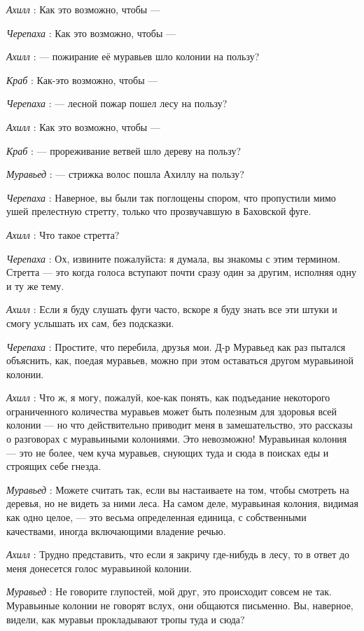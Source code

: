 \documentclass[../main.tex]{subfiles}
\begin{document}
\begin{dialogue}
\emph{Ахилл} : Как это возможно, чтобы ---

\emph{Черепаха} : Как это возможно, чтобы ---

\emph{Ахилл} : --- пожирание её муравьев шло колонии на пользу?

\emph{Краб} : Как-это возможно, чтобы ---

\emph{Черепаха} : --- лесной пожар пошел лесу на пользу?

\emph{Ахилл} : Как это возможно, чтобы ---

\emph{Краб} : --- прореживание ветвей шло дереву на пользу?

\emph{Муравьед} : --- стрижка волос пошла Ахиллу на пользу?

\emph{Черепаха} : Наверное, вы были так поглощены спором, что пропустили мимо ушей прелестную стретту, только что прозвучавшую в Баховской фуге.

\emph{Ахилл} : Что такое стретта?

\emph{Черепаха} : Ох, извините пожалуйста: я думала, вы знакомы с этим термином. Стретта --- это когда голоса вступают почти сразу один за другим, исполняя одну и ту же тему.

\emph{Ахилл} : Если я буду слушать фуги часто, вскоре я буду знать все эти штуки и смогу услышать их сам, без подсказки.

\emph{Черепаха} : Простите, что перебила, друзья мои. Д-р Муравьед как раз пытался объяснить, как, поедая муравьев, можно при этом оставаться другом муравьиной колонии.

\emph{Ахилл} : Что ж, я могу, пожалуй, кое-как понять, как подъедание некоторого ограниченного количества муравьев может быть полезным для здоровья всей колонии --- но что действительно приводит меня в замешательство, это рассказы о разговорах с муравьиными колониями. Это невозможно! Муравьиная колония --- это не более, чем куча муравьев, снующих туда и сюда в поисках еды и строящих себе гнезда.

\emph{Муравьед} : Можете считать так, если вы настаиваете на том, чтобы смотреть на деревья, но не видеть за ними леса. На самом деле, муравьиная колония, видимая как одно целое, --- это весьма определенная единица, с собственными качествами, иногда включающими владение речью.

\emph{Ахилл} : Трудно представить, что если я закричу где-нибудь в лесу, то в ответ до меня донесется голос муравьиной колонии.

\emph{Муравьед} : Не говорите глупостей, мой друг, это происходит совсем не так. Муравьиные колонии не говорят вслух, они общаются письменно. Вы, наверное, видели, как муравьи прокладывают тропы туда и сюда?


\end{dialogue}
\end{document}
